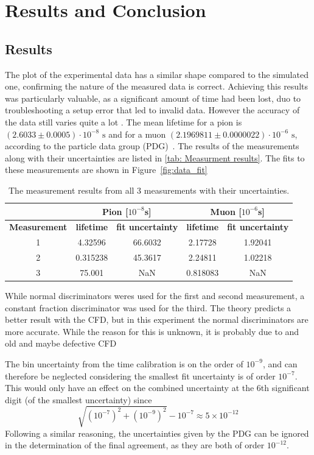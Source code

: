 \documentclass[11pt,a4paper]{article}
\begin{document}
\section{Results and Conclusion}
\subsection{Results }
The plot of the experimental data has a similar shape compared to the simulated one,
confirming the nature of the measured data is correct. Achieving this results was particularly valuable, as a significant amount of time had been lost, duo to troubleshooting a setup error that led to invalid data. However the accuracy of the data still varies quite a lot . 
The mean lifetime for a pion is $(2.6033 \pm 0.0005) \cdot 10^{-8} \text{ s}$ and for a muon $(2.1969811 \pm 0.0000022)\cdot 10^{-6} \text{ s} $, according to the particle data group (PDG)~\cite{Literature Values}. The results of the measurements along with their uncertainties are listed in \autoref{tab: Measurment results}.
The fits to these measurements are shown in Figure~\ref{fig:data_fit}



\begin{table}[ht!]
\centering
\begin{tabular}{|c|c|c|c|c|}
\hline
&\multicolumn{2}{|c|}{\textbf{Pion [$10^{-8}$s]}} 
&\multicolumn{2}{|c|}{\textbf{Muon [$10^{-6}$s]}} \\
\hline
\textbf{Measurement} & \textbf{lifetime} & \textbf{fit uncertainty} & \textbf{lifetime} & \textbf{fit uncertainty}  \\
\hline
1 & 4.32596 & 66.6032  & 2.17728 & 1.92041  \\
2 & 0.315238 & 45.3617  & 2.24811 & 1.02218 \\
3 & 75.001 & NaN & 0.818083 & NaN \\
\hline
\end{tabular}
    \caption{The measurement results from all 3 measurements with their uncertainties.}
    \label{tab: Measurment results}
\end{table}

While normal discriminators weres used for the first and second measurement, a constant fraction discriminator was used for the third. The theory predicts a better result with the CFD, but in this experiment the normal discriminators are more accurate. While the reason for this is unknown, it is probably due to and old and maybe defective CFD

The bin uncertainty from the time calibration is on the order of $10^{-9}$, and can therefore be neglected considering the smallest fit uncertainty is of order $10^{-7}$. This would only have an effect on the combined uncertainty at the 6th significant digit (of the smallest uncertainty) since 
\[
\sqrt{(10^{-7})^2 + (10^{-9})^2} - 10^{-7} \approx 5 \times 10^{-12}
\]
Following a similar reasoning, the uncertainties given by the PDG can be ignored in the determination of the final agreement, as they are both of order $10^{-12}$.
\end{document}
